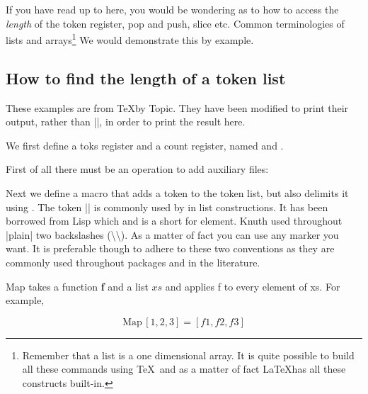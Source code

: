 If you have read up to here, you would be wondering as to how to access the \textit{length} of the token register, pop and push, slice etc. Common terminologies of lists and arrays\footnote{Remember that a list is a one dimensional array. It is quite possible to build all these commands using \TeX\ and as a matter of fact \LaTeX has all these constructs built-in.} We would demonstrate this by example.


\subsection{How to find the length of a token list}

These examples are from \TeX by Topic. They have been modified to print their
output, rather than |\message{}|, in order to print the result here.


We first define a toks register and a count register, named  and .

\begin{teX}
\newtoks\auxlist 
\newcount\auxcount
\end{teX}



First of all there must be an operation to add auxiliary files:

\begin{teX}
\def\NewAuxFile#1{\AddToAuxList{#1}%
}
\end{teX}

\def\NewAuxFile#1{\AddToAuxList{#1}%
}

\noindent Next we define a macro that adds a token to the token list, but also delimits it using . The token |\@elt| is commonly used by \latex in list constructions. It has been borrowed from Lisp which and is a short for element. Knuth used throughout |plain| two backslashes (\textbackslash\textbackslash). As a matter of fact you can use any marker you want. It is preferable though to adhere to these two conventions as they are commonly used throughout packages and in the literature.

Map takes a function \textbf{f} and a list $xs$ and applies f
to every element of xs. For example,

$$
\mbox{Map}\,[1,2,3] = [f1,f2,f3]
$$






